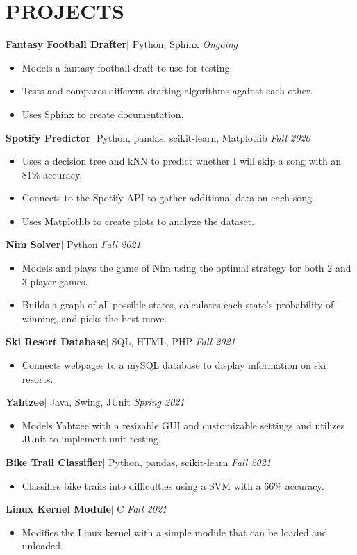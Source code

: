 \documentclass[11pt, a4paper, roman]{moderncv}
\newcommand{\project}[5]{
	\textbf{#1}\href{#2}{\:\small\faGithub\:}$|$ #3 
	\hfill\textit{#4}
	#5
	\vspace{2mm}
}
\begin{document}
\section{PROJECTS}

\project{Fantasy Football Drafter}{https://github.com/GoneSahlin/fantasydraft}{Python, Sphinx}{Ongoing}
	{\begin{itemize}
		\item Models a fantasy football draft to use for testing.
		\item Tests and compares different drafting algorithms against each other.
		\item Uses Sphinx to create documentation.
	\end{itemize}
}
{\project{Spotify Predictor}{https://github.com/GoneSahlin/CPSC222Final}{Python, pandas, scikit-learn, Matplotlib}{Fall 2020}
	{\begin{itemize}
    		\item Uses a decision tree and kNN to predict whether I will skip a song with an 81\% accuracy.
    		\item Connects to the Spotify API to gather additional data on each song.
   		 \item Uses Matplotlib to create plots to analyze the dataset.
	\end{itemize}}
}
{\project{Nim Solver}{https://github.com/GoneSahlin/Nim}{Python}{Fall 2021}
	{\begin{itemize}
    		\item Models and plays the game of Nim using the optimal strategy for both 2 and 3 player games.
    		\item Builds a graph of all possible states, calculates each state's probability of winning, and picks the best move.
	\end{itemize}}
}
{\project{Ski Resort Database}{https://github.com/GoneSahlin/321_Final_Project}{SQL, HTML, PHP}{Fall 2021}
	{\begin{itemize}
    		\item Connects webpages to a mySQL database to display information on ski resorts.
	\end{itemize}}
}
{\project{Yahtzee}{https://github.com/Gonzaga-University/yahtzee-final-game-a-a-r-o-n}{Java, Swing, JUnit}{Spring 2021}
	{\begin{itemize}
    		\item Models Yahtzee with a resizable GUI and customizable settings and utilizes JUnit to implement unit testing.
	\end{itemize}}
}
{\project{Bike Trail Classifier}{https://github.com/GoneSahlin/BikeTrailSVM}{Python, pandas, scikit-learn}{Fall 2021}
	{\begin{itemize}
    		\item Classifies bike trails into difficulties using a SVM with a 66\% accuracy.
	\end{itemize}}
}
{\project{Linux Kernel Module}{https://github.com/GU-2021-Fall-CPSC346/hw5-linux-kernel-module-dev-GoneSahlin}{C}{Fall 2021}
	{\begin{itemize}
   		\item Modifies the Linux kernel with a simple module that can be loaded and unloaded.
	\end{itemize}}
}
\end{document}
